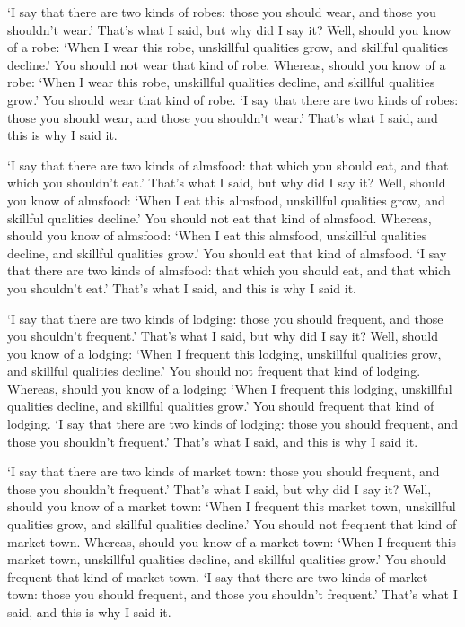 \documentclass[12pt,openany]{book}%
\begin{document}
‘I say that there are two kinds of robes: those you should wear, and those you shouldn’t wear.’ That’s what I said, but why did I say it? Well, should you know of a robe: ‘When I wear this robe, unskillful qualities grow, and skillful qualities decline.’ You should not wear that kind of robe. Whereas, should you know of a robe: ‘When I wear this robe, unskillful qualities decline, and skillful qualities grow.’ You should wear that kind of robe. ‘I say that there are two kinds of robes: those you should wear, and those you shouldn’t wear.’ That’s what I said, and this is why I said it. 

‘I say that there are two kinds of almsfood: that which you should eat, and that which you shouldn’t eat.’ That’s what I said, but why did I say it? Well, should you know of almsfood: ‘When I eat this almsfood, unskillful qualities grow, and skillful qualities decline.’ You should not eat that kind of almsfood. Whereas, should you know of almsfood: ‘When I eat this almsfood, unskillful qualities decline, and skillful qualities grow.’ You should eat that kind of almsfood. ‘I say that there are two kinds of almsfood: that which you should eat, and that which you shouldn’t eat.’ That’s what I said, and this is why I said it. 

‘I say that there are two kinds of lodging: those you should frequent, and those you shouldn’t frequent.’ That’s what I said, but why did I say it? Well, should you know of a lodging: ‘When I frequent this lodging, unskillful qualities grow, and skillful qualities decline.’ You should not frequent that kind of lodging. Whereas, should you know of a lodging: ‘When I frequent this lodging, unskillful qualities decline, and skillful qualities grow.’ You should frequent that kind of lodging. ‘I say that there are two kinds of lodging: those you should frequent, and those you shouldn’t frequent.’ That’s what I said, and this is why I said it. 

‘I say that there are two kinds of market town: those you should frequent, and those you shouldn’t frequent.’ That’s what I said, but why did I say it? Well, should you know of a market town: ‘When I frequent this market town, unskillful qualities grow, and skillful qualities decline.’ You should not frequent that kind of market town. Whereas, should you know of a market town: ‘When I frequent this market town, unskillful qualities decline, and skillful qualities grow.’ You should frequent that kind of market town. ‘I say that there are two kinds of market town: those you should frequent, and those you shouldn’t frequent.’ That’s what I said, and this is why I said it. 
\end{document}
